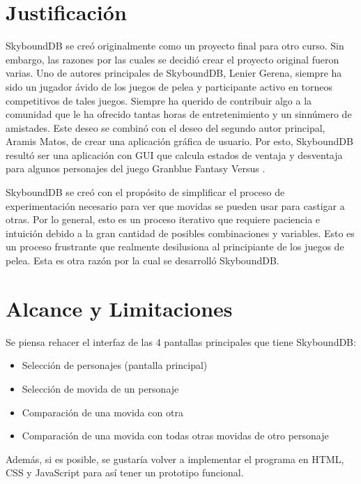 \section{Justificación}
SkyboundDB se creó originalmente como un proyecto final para otro curso. Sin embargo, las razones por las cuales se decidió crear el proyecto original fueron varias. Uno de autores principales de SkyboundDB, Lenier Gerena, siempre ha sido un jugador ávido de los juegos de pelea y participante activo en torneos competitivos de tales juegos. Siempre ha querido de contribuir algo a la comunidad que le ha ofrecido tantas horas de entretenimiento y un sinnúmero de amistades. Este deseo se combinó con el deseo del segundo autor principal, Aramis Matos, de crear una aplicación gráfica de usuario. Por esto, SkyboundDB resultó ser una aplicación con GUI que calcula estados de ventaja y desventaja para algunos personajes del juego Granblue Fantasy Versus \cite{noauthor_granblue_2022}.

SkyboundDB
se creó con el propósito de simplificar el proceso de experimentación necesario para ver que movidas se pueden usar para castigar a otras. Por lo general, esto es un proceso iterativo que requiere paciencia e intuición debido a la gran cantidad de posibles combinaciones y variables. Esto es un proceso frustrante que realmente desilusiona al principiante de los juegos de pelea. Esta es otra razón por la cual se desarrolló SkyboundDB.

\section{Alcance y Limitaciones}

Se piensa rehacer el interfaz de las 4 pantallas principales que tiene SkyboundDB:
\begin{itemize}
    \item Selección de personajes (pantalla principal)
    \item Selección de movida de un personaje
    \item Comparación de una movida con otra
    \item Comparación de una movida con todas otras movidas de otro personaje
\end{itemize}

Además, si es posible, se gustaría volver a implementar el programa en HTML, CSS y JavaScript para así tener un prototipo funcional.

